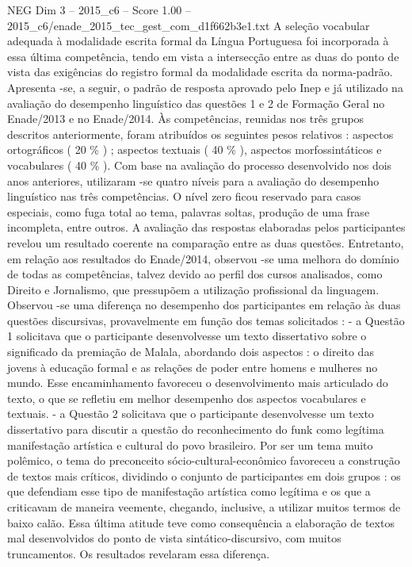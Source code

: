 \begin{textsample}{NEG Dim 3 – 2015\_c6 – Score 1.00 – 2015\_c6/enade\_2015\_tec\_gest\_com\_d1f662b3e1.txt}
A seleção vocabular adequada à modalidade escrita formal da Língua Portuguesa foi incorporada à essa última competência, tendo em vista a intersecção entre as duas do ponto de vista das exigências do registro formal da modalidade escrita da norma-padrão.
Apresenta -se, a seguir, o padrão de resposta aprovado pelo Inep e já utilizado na avaliação do desempenho linguístico das questões 1 e 2 de Formação Geral no Enade/2013 e no Enade/2014.
Às competências, reunidas nos três grupos descritos anteriormente, foram atribuídos os seguintes pesos relativos : aspectos ortográficos ( 20 \% ) ; aspectos textuais ( 40 \% ), aspectos morfossintáticos e vocabulares ( 40 \% ).
Com base na avaliação do processo desenvolvido nos dois anos anteriores, utilizaram -se quatro níveis para a avaliação do desempenho linguístico nas três competências.
O nível zero ficou reservado para casos especiais, como fuga total ao tema, palavras soltas, produção de uma frase incompleta, entre outros.
A avaliação das respostas elaboradas pelos participantes revelou um resultado coerente na comparação entre as duas questões.
Entretanto, em relação aos resultados do Enade/2014, observou -se uma melhora do domínio de todas as competências, talvez devido ao perfil dos cursos analisados, como Direito e Jornalismo, que pressupõem a utilização profissional da linguagem.
Observou -se uma diferença no desempenho dos participantes em relação às duas questões discursivas, provavelmente em função dos temas solicitados : - a Questão 1 solicitava que o participante desenvolvesse um texto dissertativo sobre o significado da premiação de Malala, abordando dois aspectos : o direito das jovens à educação formal e as relações de poder entre homens e mulheres no mundo.
Esse encaminhamento favoreceu o desenvolvimento mais articulado do texto, o que se refletiu em melhor desempenho dos aspectos vocabulares e textuais. - a Questão 2 solicitava que o participante desenvolvesse um texto dissertativo para discutir a questão do reconhecimento do funk como legítima manifestação artística e cultural do povo brasileiro.
Por ser um tema muito polêmico, o tema do preconceito sócio-cultural-econômico favoreceu a construção de textos mais críticos, dividindo o conjunto de participantes em dois grupos : os que defendiam esse tipo de manifestação artística como legítima e os que a criticavam de maneira veemente, chegando, inclusive, a utilizar muitos termos de baixo calão.
Essa última atitude teve como consequência a elaboração de textos mal desenvolvidos do ponto de vista sintático-discursivo, com muitos truncamentos.
Os resultados revelaram essa diferença.

\end{textsample}
